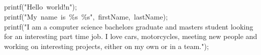 \documentclass[9pt]{developercv} %
\begin{document}
\begin{minipage}[t]{0.3\textwidth} %
	\vspace{-\baselineskip} %
	
	\\
	\\
	\\	
	\\	
\end{minipage}

\vspace{0.5cm}



\begin{minipage}[t]{0.4\textwidth} %
	\vspace{-\baselineskip} %
	
	printf("Hello~world!n"); \\
	printf("My~name~is~\%s~\%s",~firstName,~lastName); \\
	printf("I am a computer science bachelors graduate and masters student looking for an interesting part time job.
	I love cars, motorcycles, meeting new people and working on interesting projects, either on my own or in a team.");\\
\end{minipage}
\hfill %
\begin{minipage}[t]{0.5\textwidth} %
	\vspace{-\baselineskip} %
	\begin{barchart}{5.5}
	\end{barchart}
\end{minipage}
\end{document}
